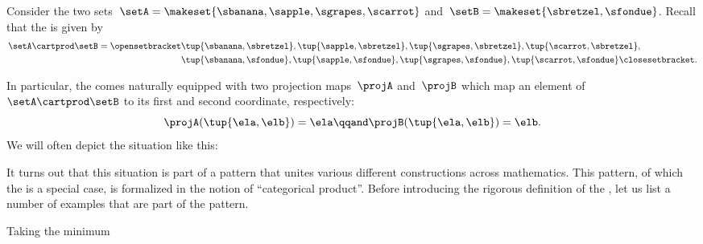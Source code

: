 \begin{example}
    Consider the two sets~$\setA = \makeset{\sbanana, \sapple, \sgrapes, \scarrot}$ and~$\setB = \makeset{ \sbretzel, \sfondue }$.
    Recall that the  is given by
    \begin{equation}
        \label{eq:cart-prod-example}
        \begin{aligned}
            \setA \cartprod \setB = \opensetbracket & \tup{\sbanana, \sbretzel}, \tup{\sapple, \sbretzel}, \tup{\sgrapes, \sbretzel}, \tup{\scarrot, \sbretzel}, \\
                                                    & \tup{\sbanana,\sfondue}, \tup{\sapple, \sfondue}, \tup{\sgrapes, \sfondue}, \tup{\scarrot, \sfondue} \closesetbracket.
        \end{aligned}
    \end{equation}

    In particular, the  comes naturally equipped with two projection maps~$\projA$ and~$\projB$ which map an element of~$\setA \cartprod \setB$ to its first and second coordinate, respectively:
    \begin{equation}\label{eq:cart-prod-projection-map-defs}
        \projA(\tup{\ela,\elb}) =  \ela  \qqand \projB(\tup{\ela,\elb}) = \elb.
    \end{equation}
    We will often depict the situation like this:
\end{example}

It turns out that this situation is part of a pattern that unites various different constructions across mathematics.
This pattern, of which the  is a special case, is formalized in the notion of ``categorical product''.
Before introducing the rigorous definition of the , let us list a number of examples that are part of the pattern.

\begin{marginfigure}
    \centering
    \caption{Taking the minimum}
    \label{fig:exa_prod_min}
\end{marginfigure}


